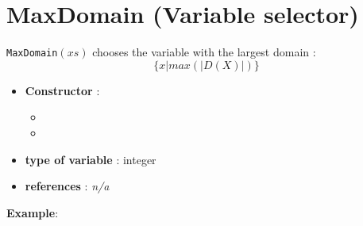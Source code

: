 \section{MaxDomain (Variable selector)}\label{maxdomain:maxdomainvarselector}\hypertarget{maxdomain:maxdomainvarselector}{}
\begin{notedef}
  \texttt{MaxDomain}$(xs)$ chooses the variable with the largest domain :
$$\{x | max(|D(X)|)\}$$
\end{notedef}

\begin{itemize}
	\item \textbf{Constructor} : 
	\begin{itemize}
	\item {}
	\item {}
	\end{itemize}	
	\item \textbf{type of variable} : integer
	\item \textbf{references} : \emph{n/a}
\end{itemize}

\textbf{Example}:
%


